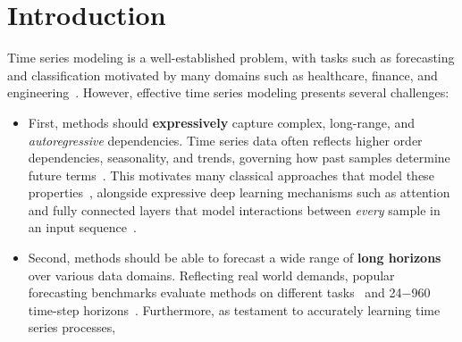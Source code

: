 %
\section{Introduction}
%
Time series modeling is a well-established problem, with tasks such as forecasting and classification motivated by many domains such as healthcare, finance, and engineering~\citep{shumway2000time}. 
However, effective time series modeling presents several challenges: 
\begin{itemize}[leftmargin=*]
\item First, 
methods should \textbf{expressively} capture complex, long-range, and \emph{autoregressive} dependencies. 
Time series data often reflects higher order dependencies, seasonality, and trends, governing how past samples determine future terms~\citep{chatfield2000time}. 
This motivates many classical approaches 
that model these properties~\citep{box1970time, winters1960forecasting}, alongside expressive deep learning mechanisms such as attention~\citep{vaswani2017attention} and fully connected layers that model interactions between \emph{every} sample in an input sequence~\citep{zeng2022transformers}.
%
\item Second, 
methods
should be able to forecast a wide range of \textbf{long horizons} over various data domains. 
Reflecting real world demands, popular forecasting benchmarks evaluate methods on
\numberMonashTasks{} different tasks~\citep{godahewa2021monash} and 24$-$960 time-step horizons~\cite{zhou2021informer}. 
Furthermore, as testament to accurately learning time series processes, 

\end{itemize}
